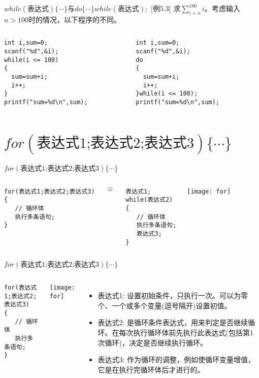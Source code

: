 \begin{frame}{$while(\text{表达式})\{ \cdots\}$与$do \{\cdots\} while(\text{表达式});$}
$[$例5.3$]$ 求$\sum\limits_{i=n}^{100}i$。考虑输入$n>100$时的情况，以下程序的不同。
\begin{columns}
\begin{lstlisting}
int i,sum=0;
scanf("%d",&i);      
while(i <= 100)     
{                   
  sum=sum+i;          
  i++;               
}                  
printf("sum=%d\n",sum);               
\end{lstlisting}
\begin{lstlisting}
int i,sum=0;
scanf("%d",&i); 
do     
{                   
  sum=sum+i;          
  i++;                
}while(i <= 100);   
printf("sum=%d\n",sum);                
\end{lstlisting}
\end{columns}
\end{frame}

\section{$for(\text{表达式1;表达式2;表达式3}) \{\cdots\}$}

\begin{frame}{$for(\text{表达式1;表达式2;表达式3}) \{\cdots\}$}
\begin{columns}
\begin{lstlisting} 
for(表达式1;表达式2;表达式3)
{
   // 循环体
   执行多条语句;  
}
\end{lstlisting}
$\equiv$
\begin{lstlisting} 
表达式1;
while(表达式2)
{
   // 循环体
   执行多条语句;
   表达式3;  
}
\end{lstlisting}
\texttt{[image: for]}
\end{columns}
\end{frame}

\begin{frame}{$for(\text{表达式1;表达式2;表达式3}) \{\cdots\}$}
\begin{columns}
\begin{lstlisting} 
for(表达式1;表达式2;表达式3)
{
   // 循环体
   执行多条语句;  
}
\end{lstlisting}
\texttt{[image: for]}
\begin{itemize}
\item 表达式1: 设置初始条件，只执行一次。可以为零个、一个或多个变量(逗号隔开)设置初值。
\item 表达式2: 是循环条件表达式，用来判定是否继续循环。在每次执行循环体前先执行此表达式(包括第1次循环)，决定是否继续执行循环。
\item 表达式3: 作为循环的调整，例如使循环变量增值，它是在执行完循环体后才进行的。	
\end{itemize}
\end{columns}
\end{frame}

